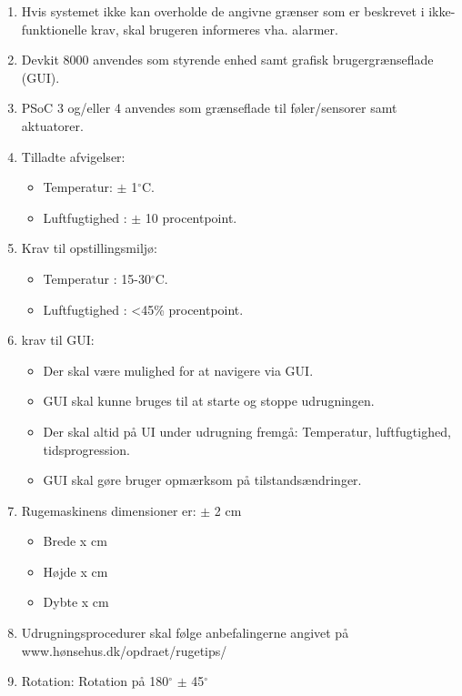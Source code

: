 
\begin{enumerate}

\item Hvis systemet ikke kan overholde de angivne grænser som er beskrevet i ikke-funktionelle krav, skal brugeren informeres vha. alarmer.

\item Devkit 8000 anvendes som styrende enhed samt grafisk brugergrænseflade (GUI).

\item PSoC 3 og/eller 4 anvendes som grænseflade til føler/sensorer samt aktuatorer.

\item Tilladte afvigelser:
	\begin{itemize}
	\item Temperatur: $\pm$ 1$^\circ$C.
	\item Luftfugtighed : $\pm$ 10 procentpoint.
	\end{itemize}

\item Krav til opstillingsmiljø:
	\begin{itemize}
	\item Temperatur : 15-30$^\circ$C.
	\item Luftfugtighed : <45\% procentpoint.
	\end{itemize}

\item krav til GUI:
	\begin{itemize}
	\item Der skal være mulighed for at navigere via GUI.
	\item GUI skal kunne bruges til at starte og stoppe udrugningen.
	\item Der skal altid på UI under udrugning fremgå: Temperatur, luftfugtighed, tidsprogression.
	\item GUI skal gøre bruger opmærksom på tilstandsændringer.
	\end{itemize}

\item Rugemaskinens dimensioner er: $\pm$ 2 cm
	\begin{itemize}
	\item Brede x cm
	\item Højde x cm
	\item Dybte x cm
	\end{itemize}
		
\item Udrugningsprocedurer skal følge anbefalingerne angivet på www.hønsehus.dk/opdraet/rugetips/

\item Rotation: Rotation på 180$^\circ$ $\pm$ 45$^\circ$

\end{enumerate}